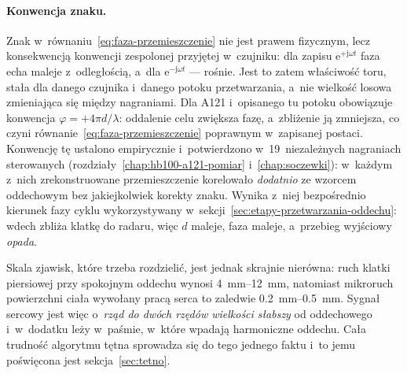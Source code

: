 \documentclass[12pt,a4paper,oneside]{report}
\begin{document}
\paragraph{Konwencja znaku.} Znak w~równaniu~\eqref{eq:faza-przemieszczenie}
nie jest prawem fizycznym, lecz konsekwencją konwencji zespolonej przyjętej
w~czujniku: dla zapisu $\mathrm{e}^{+\mathrm{j}\omega t}$ faza echa maleje
z~odległością, a~dla $\mathrm{e}^{-\mathrm{j}\omega t}$ --- rośnie. Jest to
zatem właściwość toru, stała dla danego czujnika i~danego potoku
przetwarzania, a~nie wielkość losowa zmieniająca się między nagraniami. Dla
A121 i~opisanego tu potoku obowiązuje konwencja $\varphi = +4\pi d/\lambda$:
oddalenie celu zwiększa fazę, a~zbliżenie ją zmniejsza, co czyni
równanie~\eqref{eq:faza-przemieszczenie} poprawnym w~zapisanej postaci.
Konwencję tę ustalono empirycznie i~potwierdzono w~19~niezależnych nagraniach
sterowanych (rozdziały~\ref{chap:hb100-a121-pomiar}
i~\ref{chap:soczewki}): w~każdym z~nich zrekonstruowane przemieszczenie
korelowało \emph{dodatnio} ze wzorcem oddechowym bez jakiejkolwiek korekty
znaku. Wynika z~niej bezpośrednio kierunek fazy cyklu wykorzystywany
w~sekcji~\ref{sec:etapy-przetwarzania-oddechu}: wdech zbliża klatkę do radaru,
więc $d$ maleje, faza maleje, a~przebieg wyjściowy \emph{opada}.

Skala zjawisk, które trzeba rozdzielić, jest jednak skrajnie nierówna:
ruch klatki piersiowej przy spokojnym oddechu wynosi \SIrange{4}{12}{mm},
natomiast mikroruch powierzchni ciała wywołany pracą serca to zaledwie
\SIrange{0.2}{0.5}{mm}. Sygnał sercowy jest więc o~\emph{rząd do dwóch rzędów
wielkości słabszy} od oddechowego i~w~dodatku leży w~paśmie, w~które wpadają
harmoniczne oddechu. Cała trudność algorytmu tętna sprowadza się do tego
jednego faktu i~to jemu poświęcona jest sekcja~\ref{sec:tetno}.
\end{document}
